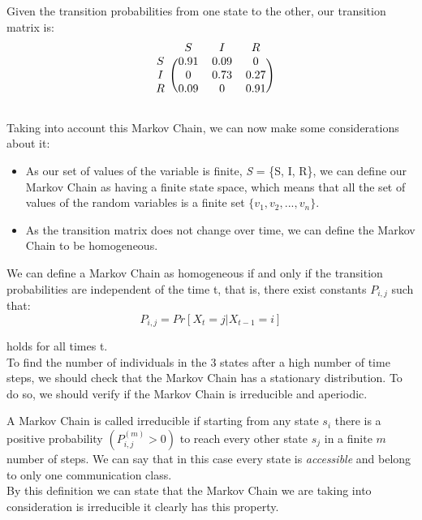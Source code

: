 \documentclass[10pt]{article}
\theoremstyle{plain}
\theoremstyle{definition}
\begin{document}
Given the transition probabilities from one state to the other, our transition matrix is:
\begin{equation}
\begin{blockarray}{cccc}
        & S & I & R \\
      \begin{block}{c(ccc)}
        S & 0.91 & 0.09 & 0 \\
        I & 0 & 0.73 & 0.27 \\
        R & 0.09 & 0 & 0.91\\
      \end{block}
    \end{blockarray}
\end{equation}

Taking into account this Markov Chain, we can now make some considerations about it: 

\begin{itemize}

\item As our set of values of the variable is finite,  \textit{S} = \{S, I, R\}, we can define our Markov Chain as having a finite state space, which means that all the set of values of the random variables is a finite set $\{v_1,v_2,...,v_{n} \}$.


\item As the transition matrix does not change over time, we can define the Markov Chain to be homogeneous.

\end{itemize} 
We can define a Markov Chain as homogeneous if and only if the transition probabilities are independent of the time t, that is, there exist constants $P_{i,j}$ such that:
\begin{equation}
    P_{i,j} =  Pr[X_t =j | X_{t-1} = i]
\end{equation}

holds for all times t. 
\\

To find the number of individuals in the 3 states after a high number of time steps, we should check that the Markov Chain has a stationary distribution. To do so, we should verify if the Markov Chain is irreducible and aperiodic.

A Markov Chain is called irreducible if starting from any state $s_i$ there is a positive probability \((P_{i,j}^{(m)} > 0)\) to reach every other state $s_j$ in a finite $\textit{m}$ number of steps. We can say that in this case every state is \textit{accessible} and belong to only one communication class.\\
By this definition we can state that the Markov Chain we are taking into consideration is irreducible it clearly has this property. \\
\end{document}
